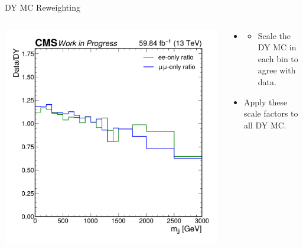 \documentclass[aspectratio=169]{beamer}
\begin{document}
\begin{frame}{DY MC Reweighting}
  \begin{columns}
    \begin{column}{0.50\textwidth}
      \centering
      \includegraphics[width=\textwidth]{../figures/plots/mass_sf_ratio.pdf}
    \end{column}
    \begin{column}{0.50\textwidth}
        \centering
        \resizebox{0.55\columnwidth}{!}{%
        
        }
        \vfill
      \begin{block}{}
        \begin{itemize}
          \item {}
          \begin{itemize}
            \item Scale the DY MC in each bin to agree with data. 
          \end{itemize}
          \item Apply these scale factors to all DY MC.
        \end{itemize}
        
      \end{block}
    \end{column}
  \end{columns}
\end{frame}
\end{document}
